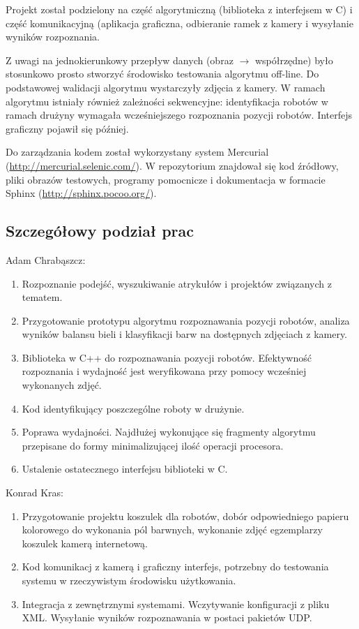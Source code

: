 \documentclass[polish,12pt]{aghthesis}
\begin{document}
Projekt został podzielony na część algorytmiczną (biblioteka z interfejsem w C)
i część komunikacyjną (aplikacja graficzna, odbieranie ramek z kamery i
wysyłanie wyników rozpoznania.

Z uwagi na jednokierunkowy przepływ danych (obraz $\to$ współrzędne) było 
stosunkowo prosto stworzyć środowisko testowania algorytmu off-line. Do 
podstawowej walidacji algorytmu wystarczyły zdjęcia z kamery. W ramach 
algorytmu istniały również zależności 
sekwencyjne: identyfikacja robotów w ramach drużyny wymagała wcześniejszego 
rozpoznania pozycji robotów. Interfejs 
graficzny pojawił się później. 

Do zarządzania kodem został wykorzystany system Mercurial
(\url{http://mercurial.selenic.com/}). 
W repozytorium znajdował się kod źródłowy, pliki obrazów testowych, programy
pomocnicze i dokumentacja w formacie Sphinx (\url{http://sphinx.pocoo.org/}).

\subsection{Szczegółowy podział prac}
Adam Chrabąszcz:
\begin{enumerate}
\item Rozpoznanie podejść, wyszukiwanie atrykułów i projektów związanych z
tematem.
\item Przygotowanie prototypu algorytmu rozpoznawania pozycji robotów,
analiza wyników balansu bieli i klasyfikacji barw na dostępnych zdjęciach z
kamery.
\item Biblioteka w C++ do rozpoznawania pozycji robotów. Efektywność
rozpoznania i wydajność jest weryfikowana przy pomocy wcześniej wykonanych 
zdjęć.
\item Kod identyfikujący poszczególne roboty w drużynie.
\item Poprawa wydajności. Najdłużej wykonujące się fragmenty algorytmu 
przepisane do formy minimalizującej ilość operacji procesora.
\item Ustalenie ostatecznego interfejsu biblioteki w C.
\end{enumerate}
Konrad Kras:
\begin{enumerate}
\item Przygotowanie projektu koszulek dla robotów, dobór odpowiedniego papieru
kolorowego do wykonania pól barwnych, wykonanie zdjęć egzemplarzy koszulek
kamerą internetową.
\item Kod komunikacj z kamerą i graficzny interfejs, potrzebny do testowania
systemu w rzeczywistym środowisku użytkowania.
\item Integracja z zewnętrznymi systemami. Wczytywanie konfiguracji z pliku XML.
Wysyłanie wyników rozpoznawania w postaci pakietów UDP.
\end{enumerate}
\end{document}
